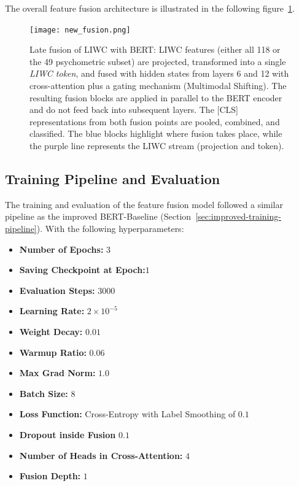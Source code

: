 \begin{itemize}
\begin{itemize}
    \end{itemize}
\end{itemize}
    

The overall feature fusion architecture is illustrated in the following figure~\ref{fig:liwc-bert-fusion}.

\begin{figure}[H]
    \centering
    \texttt{[image: new\_fusion.png]}
    \caption[Feature Fusion Architecture]{Late fusion of LIWC with BERT: LIWC features (either all 118 or the 49 psychometric subset) are projected, transformed into a single \emph{LIWC token}, and fused with hidden states from layers 6 and 12 with cross-attention plus a gating mechanism (Multimodal Shifting). The resulting fusion blocks are applied in parallel to the BERT encoder and do not feed back into subsequent layers. The [CLS] representations from both fusion points are pooled, combined, and classified. The \textcolor{blue!70!black}{blue blocks} highlight where fusion takes place, while the \textcolor{violet!70!black}{purple line} represents the LIWC stream (projection and token).}
\label{fig:liwc-bert-fusion}

\end{figure}

\subsection{Training Pipeline and Evaluation}

The training and evaluation of the feature fusion model followed a similar pipeline as the improved BERT-Baseline (Section~\ref{sec:improved-training-pipeline}). With the following hyperparameters:

\begin{itemize}
\item \textbf{Number of Epochs:} \(3\) 
\item \textbf{Saving Checkpoint at Epoch:}\(1\) 
\item \textbf{Evaluation Steps:} \(3000\)
\item \textbf{Learning Rate:} \(2\times10^{-5}\)
\item \textbf{Weight Decay:} \(0.01\)
\item \textbf{Warmup Ratio:} \(0.06\)
\item \textbf{Max Grad Norm:} \(1.0\)
\item \textbf{Batch Size:} \(8\)
\item \textbf{Loss Function:} Cross-Entropy with Label Smoothing of \(0.1\)
\item \textbf{Dropout inside Fusion} \(0.1\)
\item \textbf{Number of Heads in Cross-Attention:} \(4\)
\item \textbf{Fusion Depth:} \(1\)
\end{itemize}

